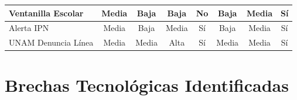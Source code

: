 \begin{table}[H]
{\begin{tabular}{|p{3.2cm}|c|c|c|c|c|c|c|}
\hline

Ventanilla Escolar &
Media &
Baja &
Baja &
No &
Baja &
Media &
Sí
\\

\hline

Alerta IPN &
Media &
Baja &
Media &
Sí &
Baja &
Media &
Sí
\\

\hline

UNAM Denuncia Línea &
Media &
Media &
Alta &
Sí &
Media &
Media &
Sí
\\

\hline

\end{tabular}

}

\end{table}


\section{Brechas Tecnológicas Identificadas}

